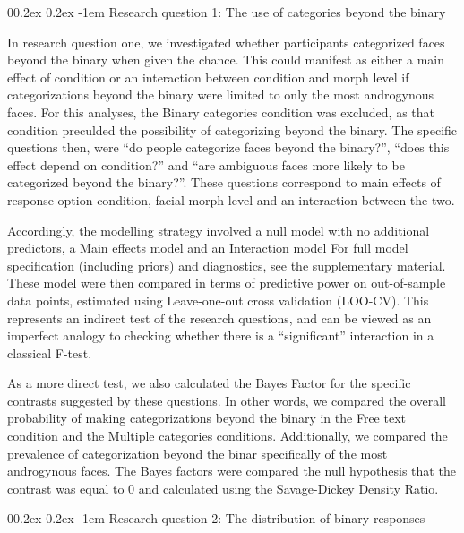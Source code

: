 \documentclass[
  man]{apa7}
\makeatletter
\let\oldparagraph\paragraph
\renewcommand{\paragraph}[1]{\oldparagraph{#1}\mbox{}}
\renewcommand{\paragraph}{\@startsection{paragraph}{4}{\parindent}%
  {0\baselineskip \@plus 0.2ex \@minus 0.2ex}%
  {-1em}%
  {\normalfont\normalsize\bfseries\itshape\typesectitle}}
\renewcommand{\paragraph}{\@startsection{paragraph}{4}{\parindent}%
  {0\baselineskip \@plus 0.2ex \@minus 0.2ex}%
  {-1em}%
  {\normalfont\normalsize\bfseries\typesectitle}}
\makeatother
\begin{document}
\hypertarget{research-question-1-the-use-of-categories-beyond-the-binary}{%
\paragraph{Research question 1: The use of categories beyond the binary}\label{research-question-1-the-use-of-categories-beyond-the-binary}}

In research question one, we investigated whether participants categorized faces beyond the binary when given the chance. This could manifest as either a main effect of condition or an interaction between condition and morph level if categorizations beyond the binary were limited to only the most androgynous faces. For this analyses, the Binary categories condition was excluded, as that condition preculded the possibility of categorizing beyond the binary. The specific questions then, were ``do people categorize faces beyond the binary?'', ``does this effect depend on condition?'' and ``are ambiguous faces more likely to be categorized beyond the binary?''. These questions correspond to main effects of response option condition, facial morph level and an interaction between the two.

Accordingly, the modelling strategy involved a null model with no additional predictors, a Main effects model and an Interaction model For full model specification (including priors) and diagnostics, see the supplementary material. These model were then compared in terms of predictive power on out-of-sample data points, estimated using Leave-one-out cross validation (LOO-CV). This represents an indirect test of the research questions, and can be viewed as an imperfect analogy to checking whether there is a ``significant'' interaction in a classical F-test.

As a more direct test, we also calculated the Bayes Factor for the specific contrasts suggested by these questions. In other words, we compared the overall probability of making categorizations beyond the binary in the Free text condition and the Multiple categories conditions. Additionally,
we compared the prevalence of categorization beyond the binar specifically of the most androgynous faces. The Bayes factors were compared the null hypothesis that the contrast was equal to 0 and calculated using the Savage-Dickey Density Ratio.

\hypertarget{research-question-2-the-distribution-of-binary-responses}{%
\paragraph{Research question 2: The distribution of binary responses}\label{research-question-2-the-distribution-of-binary-responses}}
\end{document}
